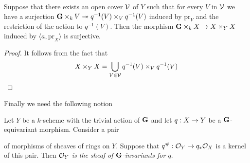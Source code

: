 \begin{fact}\label{fact:kernel_pairs_are_local_on_the_target}
Suppose that there exists an open cover ${\mathcal V}$ of $Y$ such that for every $V$ in ${\mathcal V}$ we have a surjection $\mathbf{G}\times_kV\twoheadrightarrow q^{-1}(V)\times_Vq^{-1}(V)$ induced by $\mathrm{pr}_V$ and the restriction of the action to $q^{-1}(V)$. Then the morphism $\mathbf{G}\times_kX\rightarrow X\times_YX$ induced by $\langle a, \mathrm{pr}_X\rangle$ is surjective.
\end{fact}
\begin{proof}
It follows from the fact that
$$X\times_YX = \bigcup_{V\in {\mathcal V}}q^{-1}(V)\times_Vq^{-1}(V)$$
\end{proof}
\noindent
Finally we need the following notion

\begin{definition}
Let $Y$ be a $k$-scheme with the trivial action of $\mathbf{G}$ and let $q:X\rightarrow Y$ be a $\mathbf{G}$-equivariant morphism. Consider a pair
\begin{center}
\end{center}
of morphisms of sheaves of rings on $Y$. Suppose that $q^{\#}:{\mathcal O}_Y\rightarrow q_*{\mathcal O}_X$ is a kernel of this pair. Then \textit{${\mathcal O}_Y$ is the sheaf of $\mathbf{G}$-invariants for $q$}.
\end{definition}

